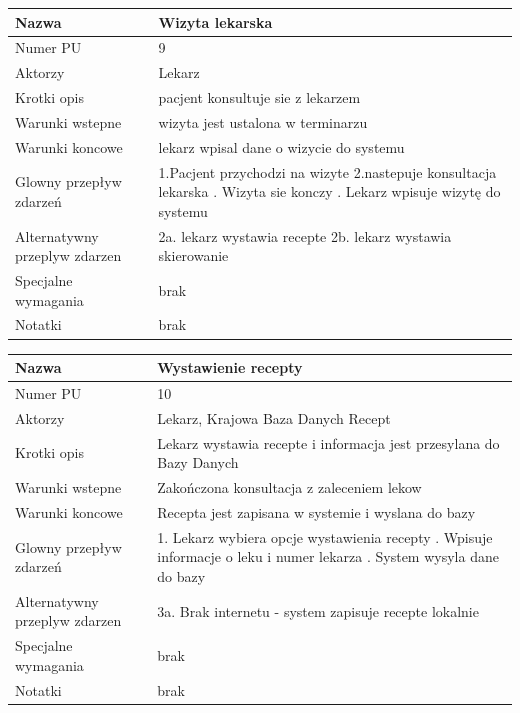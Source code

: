 \documentclass{article}
\begin{document}
\noindent
\begin{tabular}{|m{10em}|m{30em}|}
        \hline
        Nazwa &Wizyta lekarska \\
        \hline
        Numer PU & 9\\
        \hline
        Aktorzy & Lekarz\\
        \hline
        Krotki opis & pacjent konsultuje sie z lekarzem\\
        \hline
        Warunki wstepne & wizyta jest ustalona w terminarzu\\
        \hline
        Warunki koncowe & lekarz wpisal dane o wizycie do systemu\\
        \hline
        Glowny przepływ zdarzeń& 1.Pacjent przychodzi na wizyte \newline
                                 2.nastepuje konsultacja lekarska \newline
                                 3. Wizyta sie konczy \newline
                                 4. Lekarz wpisuje wizytę do systemu  \\
        \hline
        Alternatywny przeplyw zdarzen &  2a. lekarz wystawia recepte \newline
                                       2b. lekarz wystawia skierowanie\\
        \hline
        Specjalne wymagania & brak\\
        \hline
        Notatki& brak\\
        \hline
\end{tabular}

\vspace{1cm}

\noindent
\begin{tabular}{|m{10em}|m{30em}|}
        \hline
        Nazwa & Wystawienie recepty \\
        \hline
        Numer PU & 10\\
        \hline
        Aktorzy & Lekarz, Krajowa Baza Danych Recept\\
        \hline
        Krotki opis & Lekarz wystawia recepte i informacja jest przesylana do Bazy Danych\\
        \hline
        Warunki wstepne & Zakończona konsultacja z zaleceniem lekow\\
        \hline
        Warunki koncowe & Recepta jest zapisana w systemie i wyslana do bazy\\
        \hline
        Glowny przepływ zdarzeń & 1. Lekarz wybiera opcje wystawienia recepty \newline
                                 2. Wpisuje informacje o leku i numer lekarza \newline
                                 3. System wysyla dane do bazy  \\
        \hline
        Alternatywny przeplyw zdarzen &  3a. Brak internetu - system zapisuje recepte lokalnie\\
        \hline
        Specjalne wymagania & brak\\
        \hline
        Notatki& brak\\
        \hline
\end{tabular}
\end{document}
